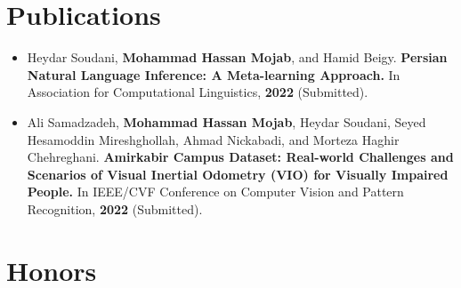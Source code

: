 \documentclass[11pt,a4paper,roman]{moderncv} %
\begin{document}
\section{Publications}

\begin{itemize}
	\item Heydar Soudani, \textbf{Mohammad Hassan Mojab}, and Hamid Beigy. \textbf{Persian Natural Language Inference: A Meta-learning Approach.} In Association for Computational Linguistics, \textbf{2022} (Submitted).
	
	\vspace{3pt}
	
	\item Ali Samadzadeh, \textbf{Mohammad Hassan Mojab}, Heydar Soudani, Seyed Hesamoddin Mireshghollah, Ahmad Nickabadi, and Morteza Haghir Chehreghani. \textbf{Amirkabir Campus Dataset: Real-world Challenges and Scenarios of Visual Inertial Odometry (VIO) for Visually Impaired People.} In IEEE/CVF Conference on Computer Vision and Pattern Recognition, \textbf{2022} (Submitted).
\end{itemize}

\section{Honors}
\end{document}

